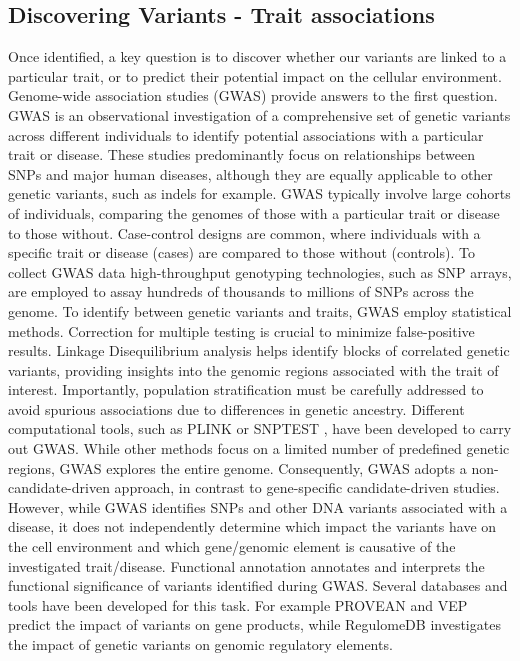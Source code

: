 \documentclass[a4paper, titlepage, openright]{book}
\begin{document}
\subsection{Discovering Variants - Trait associations}
Once identified, a key question is to discover whether our variants are linked to a particular trait, or to predict their potential impact on the cellular environment. Genome-wide association studies (GWAS) \citep{uffelmann2021genome} provide answers to the first question. GWAS is an observational investigation of a comprehensive set of genetic variants across different individuals to identify potential associations with a particular trait or disease. These studies predominantly focus on relationships between SNPs and major human diseases, although they are equally applicable to other genetic variants, such as indels for example. GWAS typically involve large cohorts of individuals, comparing the genomes of those with a particular trait or disease to those without. Case-control designs are common, where individuals with a specific trait or disease (cases) are compared to those without (controls). To collect GWAS data high-throughput genotyping technologies, such as SNP arrays, are employed to assay hundreds of thousands to millions of SNPs across the genome. To identify between genetic variants and traits, GWAS employ statistical methods. Correction for multiple testing is crucial to minimize false-positive results. Linkage Disequilibrium analysis helps identify blocks of correlated genetic variants, providing insights into the genomic regions associated with the trait of interest. Importantly, population stratification must be carefully addressed to avoid spurious associations due to differences in genetic ancestry. Different computational tools, such as PLINK \citep{purcell2007plink} or SNPTEST \citep{marchini2007new}, have been developed to carry out GWAS. While other methods focus on a limited number of predefined genetic regions, GWAS explores the entire genome. Consequently, GWAS adopts a non-candidate-driven approach, in contrast to gene-specific candidate-driven studies. However, while GWAS identifies SNPs and other DNA variants associated with a disease, it does not independently determine which impact the variants have on the cell environment and which gene/genomic element is causative of the investigated trait/disease. Functional annotation annotates and interprets the functional significance of variants identified during GWAS. Several databases and tools have been developed for this task. For example PROVEAN \citep{choi2015provean} and VEP \citep{mclaren2016ensembl} predict the impact of variants on gene products, while RegulomeDB \citep{boyle2012annotation} investigates the impact of genetic variants on genomic regulatory elements.
\end{document}
